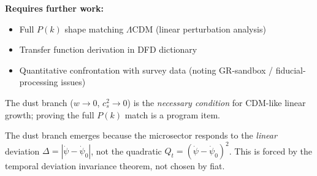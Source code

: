 \begin{tcolorbox}[colback=yellow!5!white, colframe=yellow!60!black, title={Program-Level (Not Claimed as Theorem)}]
\textbf{Requires further work:}
\begin{itemize}[nosep]
\item Full $P(k)$ shape matching $\Lambda$CDM (linear perturbation analysis)
\item Transfer function derivation in DFD dictionary
\item Quantitative confrontation with survey data (noting GR-sandbox / fiducial-processing issues)
\end{itemize}
The dust branch ($w \to 0$, $c_s^2 \to 0$) is the \emph{necessary condition} for CDM-like linear growth; proving the full $P(k)$ match is a program item.
\end{tcolorbox}

\begin{remark}
The dust branch emerges because the microsector responds to the \emph{linear} deviation $\Delta = |\dot\psi - \dot\psi_0|$, not the quadratic $Q_t = (\dot\psi - \dot\psi_0)^2$. This is forced by the temporal deviation invariance theorem, not chosen by fiat.
\end{remark}

\vspace{2em}